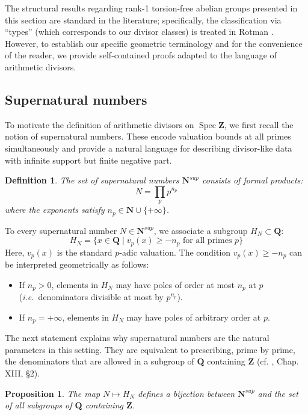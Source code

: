 \documentclass[11pt,a4paper]{article}
\newcommand{\Q}{\mathbf{Q}}
\newcommand{\Z}{\mathbf{Z}}
\newcommand{\N}{\mathbf{N}}
\def\N{{\mathbf N}}
\def\spz{\Spec \Z}
\newcommand{\Spec}{\operatorname{Spec}}
\def\spz{\Spec \Z}
\def\ie{{\it i.e.\/}\ }
\theoremstyle{plain}
\newtheorem{defn}[thm]{Definition}
\newtheorem{prop}[thm]{Proposition}
\theoremstyle{definition} %
\begin{document}
The structural results regarding rank-1 torsion-free abelian groups presented in this section are standard in the literature; specifically, the classification via ``types'' (which corresponds to our divisor classes) is treated in Rotman \cite[Theorems 10.47 and 10.48]{Rotman}. However, to establish our specific geometric terminology and for the convenience of the reader, we provide self-contained proofs adapted to the language of arithmetic divisors.




\subsection{Supernatural numbers}

To motivate the definition of arithmetic divisors on $\spz$, we first recall the
notion of supernatural numbers.
These encode valuation bounds at all primes simultaneously and provide a natural
language for describing divisor-like data with infinite support but finite negative
part.


\begin{defn}
The set of supernatural numbers $\N^{sup}$ consists of formal products:
\[
N = \prod_{p} p^{n_p}
\]
where the exponents satisfy $n_p \in \N \cup \{+\infty\}$.
  \end{defn}
To every supernatural number $N \in \N^{sup}$, we associate a subgroup $H_N \subset \Q$:
\[
H_N = \{ x \in \Q \mid v_p(x) \ge -n_p \text{ for all primes } p \}
\]
Here, $v_p(x)$ is the standard $p$-adic valuation. 
The condition $v_p(x) \ge -n_p$ can be interpreted geometrically as follows:
\begin{itemize}
    \item[] If $n_p > 0$, elements in $H_N$ may have poles of order at most $n_p$ at $p$ (\ie denominators divisible at most by $p^{n_p}$).
       \item[] If $n_p = +\infty$, elements in $H_N$ may have poles of arbitrary order at $p$.
\end{itemize}

The next statement explains why supernatural numbers are the natural parameters in this setting.
They are equivalent to prescribing, prime by prime, the denominators that are allowed in a subgroup
of $\Q$ containing $\Z$  
(cf. \cite{Serre}, Chap. XIII, \S 2). 


\begin{prop}\label{rankpro}
The map $N \mapsto H_N$ defines a bijection between $\N^{sup}$ and the set of all  subgroups of $\Q$ containing $\Z$.
\end{prop}
\end{document}
